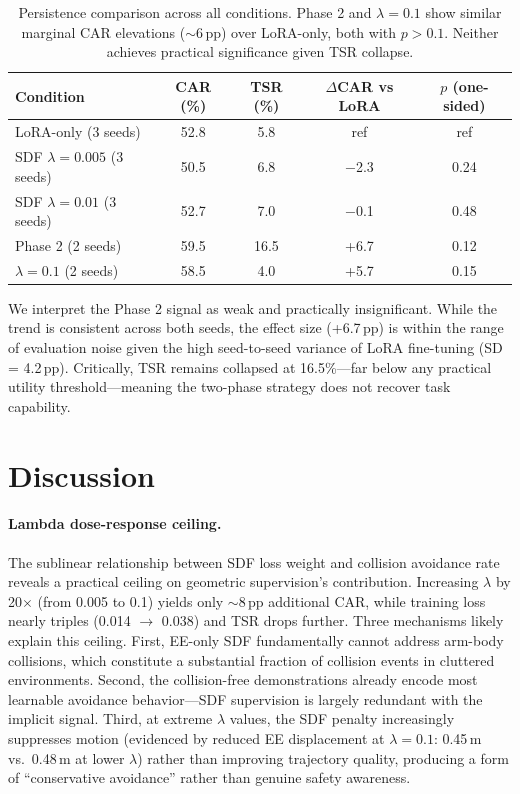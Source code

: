\documentclass[letterpaper]{article}
\begin{document}
\begin{table}[t]
\centering
\caption{Persistence comparison across all conditions. Phase 2 and $\lambda{=}0.1$ show similar marginal CAR elevations (${\sim}$6\,pp) over LoRA-only, both with $p > 0.1$. Neither achieves practical significance given TSR collapse.}
\label{tab:persistence}
\begin{tabular}{lcccc}
\toprule
Condition & CAR (\%) & TSR (\%) & $\Delta$CAR vs LoRA & $p$ (one-sided) \\
\midrule
LoRA-only (3 seeds) & 52.8 & 5.8 & ref & ref \\
SDF $\lambda{=}0.005$ (3 seeds) & 50.5 & 6.8 & $-$2.3 & 0.24 \\
SDF $\lambda{=}0.01$ (3 seeds) & 52.7 & 7.0 & $-$0.1 & 0.48 \\
Phase 2 (2 seeds) & 59.5 & 16.5 & +6.7 & 0.12 \\
$\lambda{=}0.1$ (2 seeds) & 58.5 & 4.0 & +5.7 & 0.15 \\
\bottomrule
\end{tabular}
\end{table}

We interpret the Phase 2 signal as weak and practically insignificant. While the trend is consistent across both seeds, the effect size (+6.7\,pp) is within the range of evaluation noise given the high seed-to-seed variance of LoRA fine-tuning (SD = 4.2\,pp). Critically, TSR remains collapsed at 16.5\%---far below any practical utility threshold---meaning the two-phase strategy does not recover task capability.


\section{Discussion}
\label{sec:discussion}

\paragraph{Lambda dose-response ceiling.}
The sublinear relationship between SDF loss weight and collision avoidance rate reveals a practical ceiling on geometric supervision's contribution. Increasing $\lambda$ by 20$\times$ (from 0.005 to 0.1) yields only ${\sim}$8\,pp additional CAR, while training loss nearly triples (0.014 $\to$ 0.038) and TSR drops further. Three mechanisms likely explain this ceiling. First, EE-only SDF fundamentally cannot address arm-body collisions, which constitute a substantial fraction of collision events in cluttered environments. Second, the collision-free demonstrations already encode most learnable avoidance behavior---SDF supervision is largely redundant with the implicit signal. Third, at extreme $\lambda$ values, the SDF penalty increasingly suppresses motion (evidenced by reduced EE displacement at $\lambda = 0.1$: 0.45\,m vs.\ 0.48\,m at lower $\lambda$) rather than improving trajectory quality, producing a form of ``conservative avoidance'' rather than genuine safety awareness.
\end{document}
